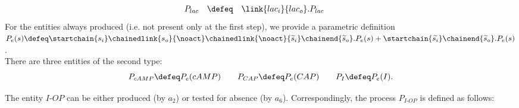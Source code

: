 \[\begin{array}{lcl@{\qquad}lcl}
 P_{lac}&\defeq&\link{lac_i}{lac_o}.P_{lac}
\end{array}\]
For the entities always produced (i.e. not present only at the first step), we  provide a  parametric
definition  
$P_e(s) \defeq  \startchain{s_i}\chainedlink{s_o}{\noact}\chainedlink{\noact}{\widetilde{s}_i}\chainend{\widetilde{s}_o}.P_e(s) +  \startchain{\widetilde{s_i}}\chainend{\widetilde{s}_o} .P_e(s) $.\\
 There are three entities of the second type:  $$P_{cAMP}\defeq P_e(cAMP) \qquad P_{CAP} \defeq P_e(CAP)\qquad P_I \defeq P_e(I).$$


The entity $I\textrm{-}OP$ can be either produced (by $a_2$) or tested for absence (by $a_6$).
Correspondingly, the process  $P_{I\textrm{-}OP}$ is defined as follows:


